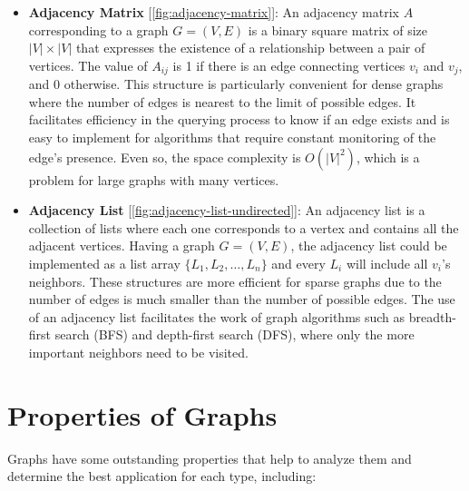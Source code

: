 \documentclass[../Thesis.tex]{subfiles}
\begin{document}
	\begin{itemize}
		\item \textbf{Adjacency Matrix} [\autoref{fig:adjacency-matrix}]: An adjacency matrix \( A \) corresponding to a graph \( G = (V, E) \) is a binary square matrix of size \( |V| \times |V| \)  that expresses the existence of a relationship between a pair of vertices. The value of \( A_{ij} \) is 1 if there is an edge connecting vertices \( v_i \) and \( v_j \), and 0 otherwise. This structure is particularly convenient for dense graphs where the number of edges is nearest to the limit of possible edges. It facilitates efficiency in the querying process to know if an edge exists and is easy to implement for algorithms that require constant monitoring of the edge's presence. Even so, the space complexity is \( O(|V|^2) \), which is a problem for large graphs with many vertices.
		
		
		\item \textbf{Adjacency List} [\autoref{fig:adjacency-list-undirected}]:  An adjacency list is a collection of lists where each one corresponds to a vertex and contains all the adjacent vertices. Having a graph  \( G = (V, E) \), the adjacency list could be implemented as a list array \( \{L_1, L_2, \ldots, L_n\} \) and every \( L_i \) will include all \( v_i \)'s neighbors. These structures are more efficient for sparse graphs due to the number of edges is much smaller than the number of possible edges. The use of an adjacency list facilitates the work of graph algorithms such as breadth-first search (BFS) and depth-first search (DFS), where only the more important neighbors need to be visited.
		
		
	\end{itemize}
	
	\section{Properties of Graphs}
	Graphs have some outstanding properties that help to analyze them and determine the best application for each type, including:
	
\end{document}
